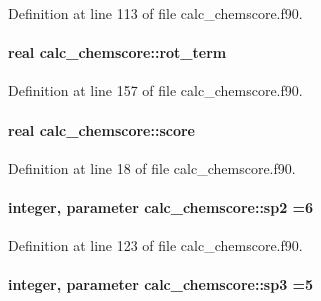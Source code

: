 Definition at line 113 of file calc\-\_\-chemscore.\-f90.

\hypertarget{classcalc__chemscore_a750abcd708dc4cad10da3fd9b3e3fea2}{
\paragraph[{rot\-\_\-term}]{\setlength{\rightskip}{0pt plus 5cm}real calc\-\_\-chemscore\-::rot\-\_\-term}}\label{classcalc__chemscore_a750abcd708dc4cad10da3fd9b3e3fea2}


Definition at line 157 of file calc\-\_\-chemscore.\-f90.

\hypertarget{classcalc__chemscore_a0a128ccdf119ded09ab8d3ef43bae64c}{
\paragraph[{score}]{\setlength{\rightskip}{0pt plus 5cm}real calc\-\_\-chemscore\-::score}}\label{classcalc__chemscore_a0a128ccdf119ded09ab8d3ef43bae64c}


Definition at line 18 of file calc\-\_\-chemscore.\-f90.

\hypertarget{classcalc__chemscore_af5cc74079916deed8dc10fc9749a5ae2}{
\paragraph[{sp2}]{\setlength{\rightskip}{0pt plus 5cm}integer, parameter calc\-\_\-chemscore\-::sp2 =6}}\label{classcalc__chemscore_af5cc74079916deed8dc10fc9749a5ae2}


Definition at line 123 of file calc\-\_\-chemscore.\-f90.

\hypertarget{classcalc__chemscore_ad73876c67ee54139a1c99297d4393db4}{
\paragraph[{sp3}]{\setlength{\rightskip}{0pt plus 5cm}integer, parameter calc\-\_\-chemscore\-::sp3 =5}}\label{classcalc__chemscore_ad73876c67ee54139a1c99297d4393db4}



